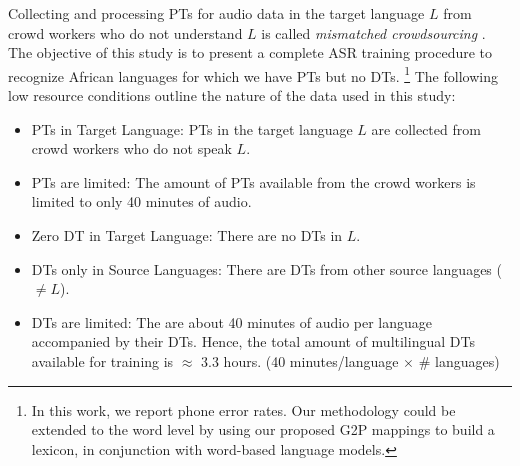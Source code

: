 \documentclass[a4paper]{article}
\begin{document}
Collecting and processing PTs for audio data in the target language $L$ from crowd workers who do not understand $L$ is called \emph{mismatched crowdsourcing} \cite{Jyothi-MismatchedCrowdsourcingTrans}. %
The objective of this study is to present a complete ASR training procedure to recognize African languages for which we have PTs but no DTs.%
\footnote{In this work, we report phone error rates. Our methodology could be extended to the word level by using our proposed G2P mappings to build a lexicon, in conjunction with word-based language models.}
%
The following low resource conditions outline the nature of the data used in this study:  \vspace{-1mm}
\begin{itemize}[leftmargin=*]
\item PTs in Target Language: PTs in the target language $L$ are collected from crowd workers who do not speak $L$. \vspace{-1.5mm}
\item PTs are limited: The amount of PTs available from the crowd workers is limited to only 40 minutes of audio.  \vspace{-1mm}
\item Zero DT in Target Language: There are no DTs in $L$.  \vspace{-1mm}
\item DTs only in Source Languages: There are DTs from other source languages ($\ne L$).  \vspace{-1mm}
\item DTs are limited: The are about 40 minutes of audio per language accompanied by their DTs. Hence, the total amount of multilingual DTs available for training is $\approx$ 3.3 hours. (40 minutes/language $\times$ \# languages)  \vspace{-1mm}
\end{itemize}
\end{document}
